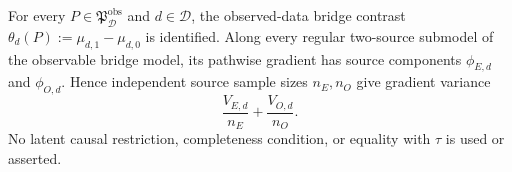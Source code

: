 For every \(P\in\mathfrak P_{\mathcal D}^{\mathrm{obs}}\) and \(d\in\mathcal D\), the observed-data bridge contrast \(\theta_d(P):=\mu_{d,1}-\mu_{d,0}\) is identified. Along every regular two-source submodel of the observable bridge model, its pathwise gradient has source components \(\phi_{E,d}\) and \(\phi_{O,d}\). Hence independent source sample sizes \(n_E,n_O\) give gradient variance
\[
 \frac{V_{E,d}}{n_E}+\frac{V_{O,d}}{n_O}.
\]
No latent causal restriction, completeness condition, or equality with \(\tau\) is used or asserted.